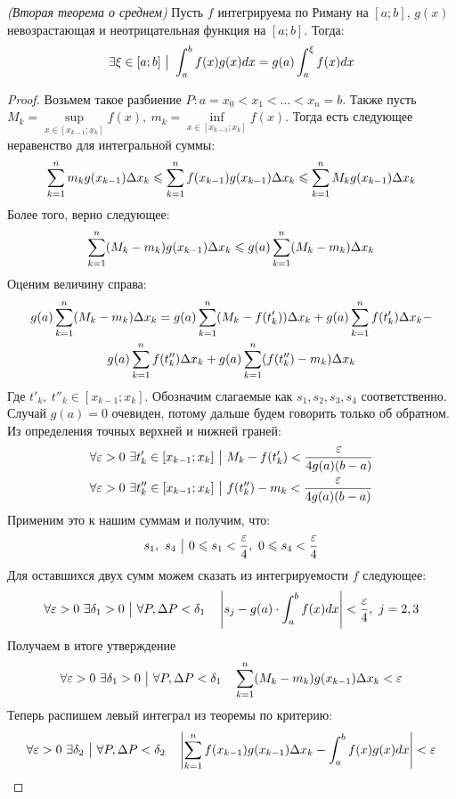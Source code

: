 \begin{theorem} \textit{(Вторая теорема о среднем)}
	Пусть $f$ интегрируема по Риману на $[a;b]$, $g(x)$ невозрастающая и неотрицательная функция на $[a;b]$. Тогда:
	\[
		\exists \xi \in [a;b] \ \big|\  \int_a^bf(x)g(x)dx = g(a)\int_a^\xi f(x)dx
	\]
\end{theorem}


\begin{proof}
	Возьмем такое разбиение $P : a = x_0 < x_1 < \ldots < x_n = b$. Также пусть $M_k = \sup\limits_{x \in [x_{k - 1};x_k]} f(x),\ m_k = \inf\limits_{x \in [x_{k - 1};x_k]} f(x)$. Тогда есть следующее неравенство для интегральной суммы:
	\[
	 	\sum\limits_{k = 1}^nm_kg(x_{k - 1})\Delta x_k \leqslant	\sum\limits_{k = 1}^nf(x_{k - 1})g(x_{k - 1})\Delta x_k \leqslant \sum\limits_{k = 1}^nM_kg(x_{k - 1})\Delta x_k
	\]
	Более того, верно следующее:
	\[
		\sum\limits_{k = 1}^n (M_k - m_k)g(x_{k - 1})\Delta x_k \leqslant g(a) \sum\limits_{k = 1}^n (M_k - m_k) \Delta x_k
	\]
	Оценим величину справа:
	\begin{multline*}
		g(a)\sum\limits_{k = 1}^n (M_k - m_k)\Delta x_k = g(a)\sum\limits_{k = 1}^n (M_k - f(t'_k))\Delta x_k + g(a)\sum\limits_{k = 1}^n f(t'_k)\Delta x_k -
		\\
		g(a)\sum\limits_{k = 1}^n f(t''_k)\Delta x_k + g(a)\sum\limits_{k = 1}^n (f(t''_k) - m_k)\Delta x_k
	\end{multline*}
	Где $t'_k,\ t''_k \in [x_{k - 1}; x_k]$.
	Обозначим слагаемые как $s_1, s_2, s_3, s_4$ соответственно. Случай $g(a) = 0$ очевиден, потому дальше будем говорить только об обратном. Из определения точных верхней и нижней граней:
	\begin{align*}
		&{\forall \varepsilon > 0\ \exists t'_k \in [x_{k - 1}; x_k] \ \big|\  M_k - f(t'_k) < \frac{\varepsilon}{4g(a)(b - a)}}
		\\
		&{\forall \varepsilon > 0\ \exists t''_k \in [x_{k - 1}; x_k] \ \big|\  f(t''_k) - m_k < \frac{\varepsilon}{4g(a)(b - a)}}
	\end{align*}
	Применим это к нашим суммам и получим, что:
	\[
		s_1,\ s_4 \such 0 \leq s_1 < \frac{\eps}{4},\ 0 \leq s_4 < \frac{\eps}{4}
	\]
	Для оставшихся двух сумм можем сказать из интегрируемости $f$ следующее:
	\[
		\forall \varepsilon > 0\ \exists \delta_1 > 0 \ \big|\  \forall P, \Delta P < \delta_1 \quad \left|s_j - g(a)\cdot \int_a^bf(x)dx\right| < \frac{\varepsilon}{4},\ j = 2, 3
	\]
	Получаем в итоге утверждение
	\[
		\forall \varepsilon > 0\ \exists \delta_1 > 0 \ \big|\  \forall P, \Delta P < \delta_1 \quad \sum\limits_{k = 1}^n(M_k - m_k)g(x_{k - 1})\Delta x_k < \varepsilon
	\]
	Теперь распишем левый интеграл из теоремы по критерию:
	\[
		\forall \varepsilon > 0\ \exists \delta_2 \ \big|\  \forall P, \Delta P < \delta_2 \quad \left|\sum\limits_{k = 1}^nf(x_{k - 1})g(x_{k - 1}) \Delta x_k - \int_a^bf(x)g(x)dx\right| < \varepsilon
\]
\end{proof}
